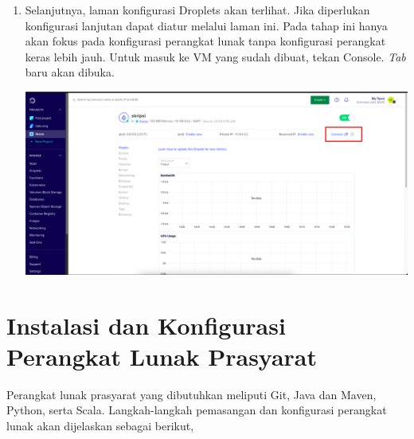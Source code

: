 \begin{enumerate}
\begin{center}
	\end{center} 
  \item Selanjutnya, laman konfigurasi Droplets akan terlihat. Jika diperlukan konfigurasi lanjutan dapat diatur melalui laman ini. Pada tahap ini hanya akan fokus pada konfigurasi perangkat lunak tanpa konfigurasi perangkat keras lebih jauh. Untuk masuk ke VM yang sudah dibuat, tekan Console. \textit{Tab} baru akan dibuka.
	\begin{center}
	\includegraphics[width=1\linewidth]{figures/ch99/ap1/5.png}
	\end{center} 
\end{enumerate}


\chapter{Instalasi dan Konfigurasi Perangkat Lunak Prasyarat}
\label{appendix:B}

Perangkat lunak prasyarat yang dibutuhkan meliputi Git, Java dan Maven, Python, serta Scala. Langkah-langkah pemasangan dan konfigurasi perangkat lunak akan dijelaskan sebagai berikut,

